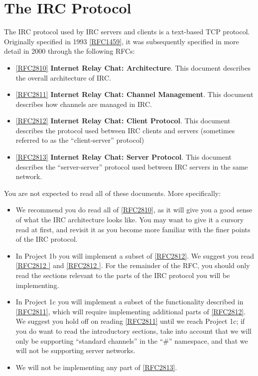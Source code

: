 \documentclass[10pt]{article}
\newcommand{\RFC}[1]{\href{http://tools.ietf.org/html/rfc#1}{[RFC#1]}}
\newcommand{\RFCsection}[2]{\href{http://tools.ietf.org/html/rfc#1\#section-#2}{[RFC#1 \textsection #2]}}
\begin{document}
\section{The IRC Protocol}
\label{sec:protocol}

The IRC protocol used by IRC servers and clients is a text-based TCP protocol. Originally specified in 1993 \RFC{1459}, it was subsequently specified in more detail in 2000 through the following RFCs:

\begin{itemize}
\item \RFC{2810} \textbf{Internet Relay Chat: Architecture}. This document describes the overall architecture of IRC.
\item \RFC{2811} \textbf{Internet Relay Chat: Channel Management}. This document describes how channels are managed in IRC.
\item \RFC{2812} \textbf{Internet Relay Chat: Client Protocol}. This document describes the protocol used between IRC clients and servers (sometimes referred to as the ``client-server'' protocol)
\item \RFC{2813} \textbf{Internet Relay Chat: Server Protocol}. This document describes the ``server-server'' protocol used between IRC servers in the same network.
\end{itemize}

You are not expected to read all of these documents. More specifically:

\begin{itemize}
\item We recommend you do read all of \RFC{2810}, as it will give you a good sense of what the IRC architecture looks like. You may want to give it a cursory read at first, and revisit it as you become more familiar with the finer points of the IRC protocol.
\item In Project 1b you will implement a subset of \RFC{2812}. We suggest you read \RFCsection{2812}{1} and \RFCsection{2812}{2}. For the remainder of the RFC, you should only read the sections relevant to the parts of the IRC protocol you will be implementing.
\item In Project 1c you will implement a subset of the functionality described in \RFC{2811}, which will require implementing additional parts of \RFC{2812}. We suggest you hold off on reading \RFC{2811} until we reach Project 1c; if you do want to read the introductory sections, take into account that we will only be supporting ``standard channels'' in the ``\#'' namespace, and that we will not be supporting server networks.
\item We will not be implementing any part of \RFC{2813}.
\end{itemize}
\end{document}
